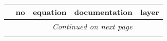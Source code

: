 

\renewcommand{\arraystretch}{2}

\begin{longtable}{|p{0.5cm}|p{0.5cm}|p{12cm}|p{6cm}|p{6cm}|}\hline
&no & equation &documentation &layer \\\hline\hline
\endhead
\hline \multicolumn{4}{r}{\textit{Continued on next page}} \\
\endfoot
\hline
\endlastfoot

\hline
\end{longtable}